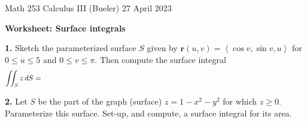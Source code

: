 \documentclass[11pt]{amsart}
\newcommand{\br}{\mathbf{r}}
\newcommand{\prob}[1]{\bigskip\noindent\textbf{#1.}\quad }
\begin{document}
\scriptsize \noindent Math 253 Calculus III (Bueler) \hfill 27 April 2023 
\normalsize\medskip

\Large\centerline{\textbf{Worksheet: Surface integrals}}
\medskip
\normalsize

\thispagestyle{empty}

\bigskip

\prob{1}  Sketch the parameterized surface $S$ given by $\br(u,v)=\left<\cos v,\sin v,u\right>$ for $0 \le u \le 5$ and $0 \le v \le \pi$.  Then compute the surface integral
    $$\iint_S z \,dS = \hspace{5.0in}$$
\vfill

\prob{2}  Let $S$ be the part of the graph (surface) $z=1-x^2-y^2$ for which $z \ge 0$.  Parameterize this surface.  Set-up, and compute, a surface integral for its area.
\vfill

%
\end{document}
